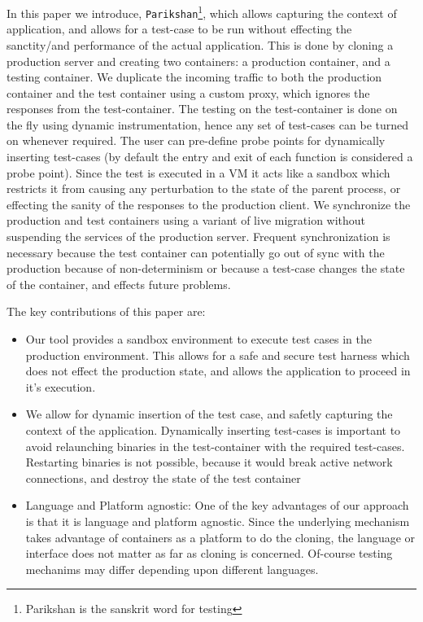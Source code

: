In this paper we introduce, \texttt{Parikshan}\footnote{Parikshan is the sanskrit word for testing}, which allows capturing the context of application, and allows for a test-case to be run without effecting the sanctity/and performance of the actual application. 
This is done by cloning a production server and creating two containers: a production container, and a testing container. 
We duplicate the incoming traffic to both the production container and the test container using a custom proxy, which ignores the responses from the test-container. 
The testing on the test-container is done on the fly using dynamic instrumentation, hence any set of test-cases can be turned on whenever required. 
The user can pre-define probe points for dynamically inserting test-cases (by default the entry and exit of each function is considered a probe point).
Since the test is executed in a VM it acts like a sandbox which restricts it from causing any perturbation to the state of the parent process, or effecting the sanity of the responses to the production client. 
We synchronize the production and test containers using a variant of live migration without suspending the services of the production server. 
Frequent synchronization is necessary because the test container can potentially go out of sync with the production because of non-determinism or because a test-case changes the state of the container, and effects future problems. 


The key contributions of this paper are:

\begin{itemize}
\item Our tool provides a sandbox environment to execute test cases in the production environment. 
This allows for a safe and secure test harness which does not effect the production state, and allows the application to proceed in it's execution.
\item We allow for dynamic insertion of the test case, and safetly capturing the context of the application. Dynamically inserting test-cases is important to avoid relaunching binaries in the test-container with the required test-cases. 
Restarting binaries is not possible, because it would break active network connections, and destroy the state of the test container
\item Language and Platform agnostic: One of the key advantages of our approach is that it is language and platform agnostic. Since the underlying mechanism takes advantage of containers as a platform to do the cloning, the language or interface does not matter as far as cloning is concerned. 
Of-course testing mechanims may differ depending upon different languages.
\end{itemize}

